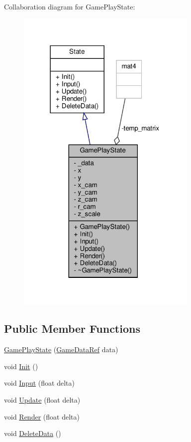 Collaboration diagram for Game\+Play\+State\+:
\nopagebreak
\begin{figure}[H]
\begin{center}
\leavevmode
\includegraphics[width=246pt]{classGamePlayState__coll__graph}
\end{center}
\end{figure}
\subsection*{Public Member Functions}
\begin{DoxyCompactItemize}
\item 
\hyperlink{classGamePlayState_a189d187dd3caac0691e1862a89172223}{Game\+Play\+State} (\hyperlink{game_8h_a513c9dd465a0df41dbb4daf40cc717c2}{Game\+Data\+Ref} data)
\item 
void \hyperlink{classGamePlayState_ae13389eea1f83f27d18ba200f107937d}{Init} ()
\item 
void \hyperlink{classGamePlayState_a3bc9231fd11546b5dd13581ed2aa1afa}{Input} (float delta)
\item 
void \hyperlink{classGamePlayState_a19bcc1ff2a83a3aa001010ae35d67b85}{Update} (float delta)
\item 
void \hyperlink{classGamePlayState_a4bd296aa04088a3d8249f569e86f21a7}{Render} (float delta)
\item 
void \hyperlink{classGamePlayState_a8a393249f2deabe0fe8f236b4e58cb17}{Delete\+Data} ()
\end{DoxyCompactItemize}
